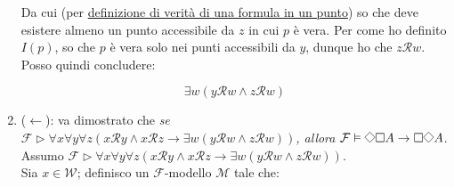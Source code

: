 \documentclass[a4paper,12pt]{article}
\newcommand{\Dmd}{\mathord{\vcenter{\hbox{\tikz[baseline=-0.6ex]{\draw[line width=0.4pt, scale=1, rotate=45] (0,0) rectangle (0.2,0.2);}}}}} %
\begin{document}
\begin{dimo}
\begin{enumerate}
		      Da cui (per \hyperlink{defverp}{definizione di verità di una formula in un punto}) so che deve esistere almeno un punto accessibile da $z$ in cui $p$ è vera. Per come ho definito $I(p)$, so che $p$ è vera solo nei punti accessibili da $y$, dunque ho che $z\mathcal{R}w$. Posso quindi concludere:

		      \begin{minipage}{0.48\textwidth}
			      $$\exists w (y\mathcal{R}w \land z\mathcal{R}w)$$
		      \end{minipage}
		      \begin{minipage}{0.48\textwidth}
			      \begin{center}
			      \end{center}
		      \end{minipage}
		      \vspace{0pt}

		\item ($\leftarrow$): va dimostrato che \emph{se $\mathcal{F} \rhd \forall x \forall y \forall z (x\mathcal{R}y \land x\mathcal{R}z \to \exists w(y\mathcal{R}w \land z\mathcal{R}w))$, allora $\mathcal{F} \vDash \Dmd \Box A \to \Box \Dmd A$}. \\
		      Assumo $\mathcal{F} \rhd \forall x \forall y \forall z (x\mathcal{R}y \land x\mathcal{R}z \to \exists w(y\mathcal{R}w \land z\mathcal{R}w))$. \\
		      Sia $x \in \mathcal{W}$; definisco un $\mathcal{F}$-modello $\mathcal{M}$ tale che: \\


\end{enumerate}
\end{dimo}
\end{document}
